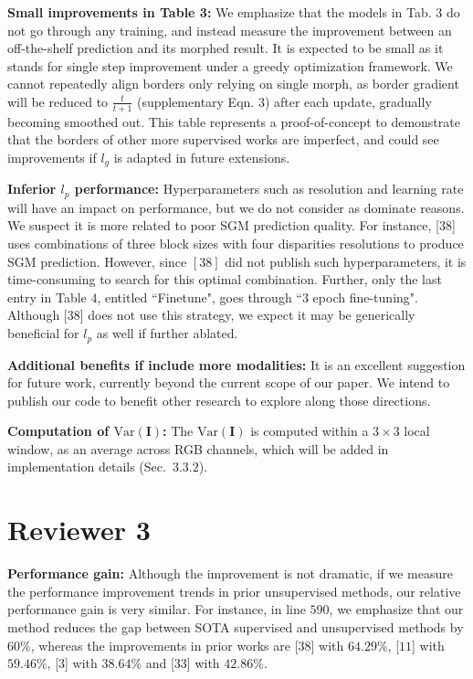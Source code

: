 \documentclass[10pt,twocolumn,letterpaper]{article}
\begin{document}
\noindent\textbf{Small improvements in Table 3:} 
We emphasize that the models in Tab. $3$ do not go through any training, and instead measure the improvement between an off-the-shelf prediction and its morphed result. 
It is expected to be small as it stands for single step improvement under a greedy optimization framework. 
We cannot repeatedly align borders only relying on single morph, as border gradient will be reduced to $\frac{t}{t+1}$ (supplementary Eqn. $3$) after each update, gradually becoming smoothed out. 
This table represents a proof-of-concept to demonstrate that the borders of other more supervised works are imperfect, and could see improvements if $l_g$ is adapted in future extensions. 

\noindent\textbf{Inferior ${l_p}$ performance:} 
Hyperparameters such as resolution and learning rate will have an impact on performance, but we do not consider as dominate reasons. 
We suspect it is more related to poor SGM prediction quality. 
For instance, [$38$] uses combinations of three block sizes with four disparities resolutions to produce SGM prediction. 
However, since $[38]$ did not publish such hyperparameters, it is time-consuming to search for this optimal combination. 
Further, only the last entry in Table $4$, entitled ``Finetune", goes through ``$3$ epoch fine-tuning". 
Although [$38$] does not use this strategy, we expect it may be generically beneficial for $l_p$ as well if further ablated. 

\noindent\textbf{Additional benefits if include more modalities:} 
It is an excellent suggestion for future work, currently beyond the current scope of our paper. 
We intend to publish our code to benefit other research to explore along those directions.

\noindent\textbf{Computation of $\text{Var}(\mathbf{I})$: } 
The $\text{Var}(\mathbf{I})$ is computed within a $3 \times 3$ local window, as an average across RGB channels, which will be added in implementation details (Sec.~$3.3.2$).

\vspace{-2.5mm}
\section*{Reviewer 3}
\vspace{-1.5mm}
\noindent \textbf{Performance gain:} 
Although the improvement is not dramatic, if we measure the performance improvement trends in prior unsupervised methods, our relative performance gain is very similar.
For instance, in line $590$, we emphasize that our method reduces the gap between SOTA supervised and unsupervised methods by $60\%$, whereas the improvements in prior works are [$38$] with $64.29\%$, [$11$] with $59.46\%$, [$3$] with $38.64\%$ and [$33$] with $42.86\%$. 
\end{document}
